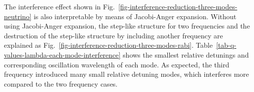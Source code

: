 \documentclass[%
reprint,
 amsmath,amssymb,
 prd,
]{revtex4-1}
\begin{document}
The interference effect shown in Fig.~\ref{fig-interference-reduction-three-modes-neutrino} is also interpretable by means of Jacobi-Anger expansion. Without using Jacobi-Anger expansion, the step-like structure for two frequencies and the destruction of the step-like structure by including another frequency are explained as Fig.~\ref{fig-interference-reduction-three-modes-rabi}. Table~\ref{tab-q-values-lambda-each-mode-interference} shows the smallest relative detunings and corresponding oscillation wavelength of each mode. As expected, the third frequency introduced many small relative detuning modes, which interferes more compared to the two frequency cases.




\end{document}
